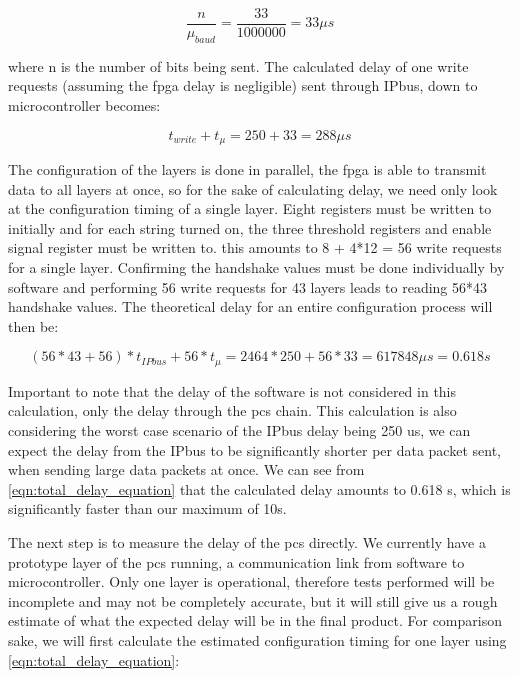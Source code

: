 \documentclass[main.tex]{subfiles}
\begin{document}
\begin{equation} \label{eqn:mu_calculation}
\frac{n}{\mu_{baud}}=\frac{33}{1000000}=33 \mu s
\end{equation}

where n is the number of bits being sent. The calculated delay of one write requests (assuming the \gls{fpga} delay is negligible) sent through IPbus, down to microcontroller becomes:

\begin{equation} \label{eqn:write_delay_equation}
t_{write}+t_{\mu }= 250 + 33 = 288\mu s
\end{equation}

The configuration of the layers is done in parallel, the \gls{fpga} is able to transmit data to all layers at once, so for the sake of calculating delay, we need only look at the configuration timing of a single layer. Eight registers must be written to initially and for each string turned on, the three threshold registers and enable signal register must be written to. this amounts to 8 + 4*12 = 56 write requests for a single layer. Confirming the handshake values must be done individually by software and performing 56 write requests for 43 layers leads to reading 56*43 handshake values. The theoretical delay for an entire configuration process will then be:

\begin{equation} \label{eqn:total_delay_equation}
(56*43+56)*t_{IPbus}+56*t_{\mu }= 2464 * 250 + 56*33 = 617 848\mu s = 0.618 s
\end{equation}

Important to note that the delay of the software is not considered in this calculation, only the delay through the \gls{pcs} chain. This calculation is also considering the worst case scenario of the IPbus delay being 250 us, we can expect the delay from the IPbus to be significantly shorter per data packet sent, when sending large data packets at once. We can see from \autoref{eqn:total_delay_equation} that the calculated delay amounts to 0.618 s, which is significantly faster than our maximum of 10s.

The next step is to measure the delay of the \gls{pcs} directly. We currently have a prototype layer of the \gls{pcs} running, a communication link from software to microcontroller. Only one layer is operational, therefore tests performed will be incomplete and may not be completely accurate, but it will still give us a rough estimate of what the expected delay will be in the final product. For comparison sake, we will first calculate the estimated configuration timing for one layer using \autoref{eqn:total_delay_equation}:
\end{document}
